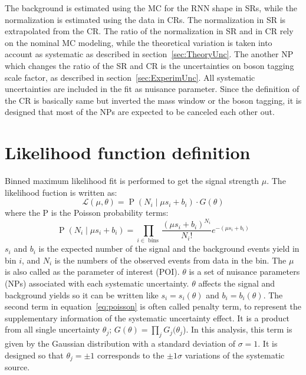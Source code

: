 The background is estimated using the MC for the RNN shape in SRs, while the normalization is estimated using the data in CRs.
The normalization in SR is extrapolated from the CR. 
The ratio of the normalization in SR and in CR rely on the nominal MC modeling, while the theoretical variation is taken into account as systematic as described in section~\ref{sec:TheoryUnc}.
The another NP which changes the ratio of the SR and CR is the uncertainties on boson tagging scale factor, as described in section~\ref{sec:ExperimUnc}.
All systematic uncertainties are included in the fit as nuisance parameter. Since the definition of the CR is basically same but inverted the mass window or the boson tagging, it is designed that most of the NPs are expected to be canceled each other out.

\section{Likelihood function definition}
\label{sec:likelihood}
Binned maximum likelihood fit is performed to get the signal strength $\mu$. The likelihood fuction is written as:
\begin{equation}
\label{eq:poisson}
\mathcal{L}(\mu, \theta) = \operatorname{P}\left(N_{i} \mid \mu s_{i}+b_{i}\right) \cdot G(\theta) 
\end{equation}
where the P is the Poisson probability terms:
\begin{equation}
\operatorname{P}\left(N_{i} \mid \mu s_{i}+b_{i}\right) = \prod_{i \in \text { bins }} \frac{\left(\mu s_{i}+b_{i}\right)^{N_{i}}}{N_{i} !} e^{-\left(\mu s_{i}+b_{i}\right)} 
\end{equation}
$s_i$ and $b_i$ is the expected number of the signal and the background events yield in bin $i$, and $N_i$ is the numbers of the observed events from data in the bin. 
The $\mu$ is also called as the parameter of interest (POI). $\theta$ is a set of nuisance parameters (NPs) associated with each systematic uncertainty. $\theta$ affects the signal and background yields so it can be written like $s_{i}=s_{i}(\theta)$ and $b_{i}=b_{i}(\theta)$. 
The second term in equation~\ref{eq:poisson} is often called penalty term, to represent the supplementary information of the systematic uncertainty effect. It is a product from all single uncertainty $\theta_j$; $G(\theta) = \prod_{j}G_{j}(\theta_{j}$). 
In this analysis, this term is given by the Gaussian distribution with a standard deviation of $\sigma = 1$. It is designed so that $\theta_j = \pm 1$ corresponds to the $\pm 1 \sigma$ variations of the systematic source. 




